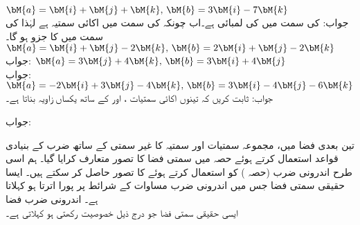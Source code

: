\quad
$\bM{a}=\bM{i}+\bM{j}+\bM{k},\, \bM{b}=3\bM{i}-7\bM{k}$\\
جواب: کی سمت میں  کی لمبائی  ہے۔اب چونکہ  کی سمت میں اکائی سمتیہ
  ہے لہٰذا  کی سمت میں  کا جزو
  ہو گا۔
\quad
$\bM{a}=\bM{i}+\bM{j}-2\bM{k},\, \bM{b}=2\bM{i}+\bM{j}-2\bM{k}$\\
جواب:
\quad
$\bM{a}=3\bM{j}+4\bM{k},\, \bM{b}=3\bM{i}+4\bM{j}$\\
جواب:
\quad
$\bM{a}=-2\bM{i}+3\bM{j}-4\bM{k},\, \bM{b}=3\bM{i}-4\bM{j}-6\bM{k}$\\
جواب:
ثابت کریں کہ  تینوں اکائی سمتیات ،  اور  کے ساتھ یکساں زاویہ بناتا ہے۔

جواب:

تین بعدی فضا میں، مجموعہ سمتیات اور سمتیہ کا غیر سمتی کے ساتھ ضرب کے بنیادی قواعد استعمال کرتے ہوئے حصہ  میں سمتی فضا کا تصور متعارف کرایا گیا۔ ہم اسی طرح اندرونی ضرب  (حصہ ) کو استعمال کرتے ہوئے  کا تصور حاصل کر سکتے ہیں۔ ایسا حقیقی سمتی فضا جس میں اندرونی ضرب مساوات  کے شرائط پر پورا اترتا ہو  کہلاتا ہے۔  
\quad اندرونی ضرب فضا\\
ایسی حقیقی سمتی فضا  جو درج ذیل خصوصیت رکھتی ہو  کہلاتی ہے۔  

